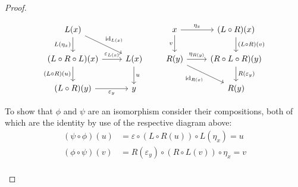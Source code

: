 \begin{theorem}
\begin{proof}
\begin{description}
        \[\begin{tikzcd}[ampersand replacement=\&]
          {L(x)} \\
          {(L\circ R\circ L)(x)} \& {L(x)} \\
          {(L\circ R)(y)} \& y
          \arrow["{\id_{L(x)}}", from=1-1, to=2-2]
          \arrow["{L(\eta_x)}"', from=1-1, to=2-1]
          \arrow["{\varepsilon_{L(x)}}", from=2-1, to=2-2]
          \arrow["u", from=2-2, to=3-2]
          \arrow["{(L\circ R)(u)}"', from=2-1, to=3-1]
          \arrow["{\varepsilon_y}"', from=3-1, to=3-2]
        \end{tikzcd}
        \qquad
        \begin{tikzcd}[ampersand replacement=\&]
          x \& {(L\circ R)(x)} \\
          {R(y)} \& {(R\circ L\circ R)(y)} \\
          \& {R(y)}
          \arrow["{\id_{R(x)}}"', from=2-1, to=3-2]
          \arrow["{\eta_{R(y)}}", from=2-1, to=2-2]
          \arrow["{R(\varepsilon_y)}", from=2-2, to=3-2]
          \arrow["{(L\circ R)(v)}", from=1-2, to=2-2]
          \arrow["v"', from=1-1, to=2-1]
          \arrow["{\eta_x}", from=1-1, to=1-2]
        \end{tikzcd}\]

        To show that $\phi$ and $\psi$ are an isomorphism consider their
        compositions, both of which are the identity by use of the respective
        diagram above:
        \[
          \begin{aligned}
            (\psi\circ\phi)(u) &=
              \varepsilon \circ (L\circ R(u)) \circ L(\eta_x) = u\\
            (\phi\circ\psi)(v) &=
              R(\varepsilon_y)\circ (R\circ L(v)) \circ \eta_x = v\\
          \end{aligned}
        \]
    \end{description}
  \end{proof}
\end{theorem}